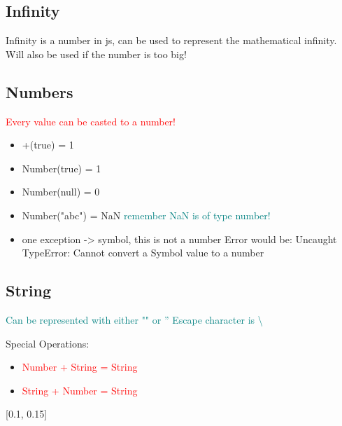 \documentclass[main.tex,fontsize=6pt,paper=a4,paper=landscape,DIV=calc,]{scrartcl}
\begin{document}
\begin{multicols*}{4}
\subsection{Infinity}  
Infinity is a number in js, can be used to represent the mathematical infinity.\newline
Will also be used if the number is too big!

\subsection{Numbers}  
\textcolor{red}{Every value can be casted to a number!}\newline
\begin{itemize}
  \item +(true) = 1
  \item Number(true) = 1
  \item Number(null) = 0
  \item Number("abc") = NaN \textcolor{teal}{remember NaN is of type number!}
  \item one exception -> symbol, this is not a number\newline
    Error would be: Uncaught TypeError: Cannot convert a Symbol value to a number
  
\end{itemize}

\subsection{String}  
\textcolor{teal}{Can be represented with either "" or ''}\newline
\textcolor{teal}{Escape character is \textbackslash}\newline
{}
{
  Special Operations:
  \begin{itemize}
  \item \textcolor{red}{Number + String = String}
  \item \textcolor{red}{String + Number = String}
  \, \newline
  \, \newline
  \, \newline
  \end{itemize} 
}[0.1, 0.15]


\end{multicols*}
\end{document}

